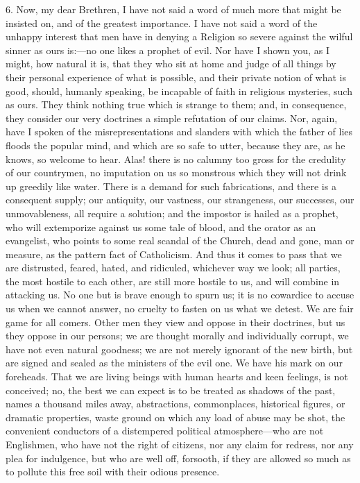 6. Now, my dear Brethren, I have not said a word of
much more that might be insisted on, and of the greatest
importance. I have not said a word of the unhappy
interest that men have in denying a Religion so severe
against the wilful sinner as ours is:—no one likes a
prophet of evil. Nor have I shown you, as I might, how
natural it is, that they who sit at home and judge of all
things by their personal experience of what is possible,
and their private notion of what is good, should, humanly
speaking, be incapable of faith in religious mysteries,
such as ours. They think nothing true which is strange to
them; and, in consequence, they consider our very
doctrines a simple refutation of our claims. Nor, again,
have I spoken of the misrepresentations and slanders with
which the father of lies floods the popular mind, and
which are so safe to utter, because they are, as he
knows, so welcome to hear. Alas! there is no calumny too
gross for the credulity of our countrymen, no imputation
on us so monstrous which they will not drink up greedily
like water. There is a demand for such fabrications, and
there is a consequent supply; our antiquity, our
vastness, our strangeness, our successes, our
unmovableness, all require a solution; and the impostor
is hailed as a prophet, who will extemporize against us
some tale of blood, and the orator as an evangelist, who
points to some real scandal of the Church, dead and gone,
man or measure, as the pattern fact of Catholicism. And
thus it comes to pass that we are distrusted, feared,
hated, and ridiculed, whichever way we look; all parties,
the most hostile to each other, are still more hostile to
us, and will combine in attacking us. No one but is brave
enough to spurn us; it is no cowardice to accuse us when
we cannot answer, no cruelty to fasten on us what we
detest. We are fair game for all comers. Other men they
view and oppose in their doctrines, but us they oppose in
our persons; we are thought morally and individually
corrupt, we have not even natural goodness; we are not
merely ignorant of the new birth, but are signed and
sealed as the ministers of the evil one. We have his mark
on our foreheads. That we are living beings with human
hearts and keen feelings, is not conceived; no, the best
we can expect is to be treated as shadows of the past,
names a thousand miles away, abstractions, commonplaces,
historical figures, or dramatic properties, waste ground
on which any load of abuse may be shot, the convenient
conductors of a distempered political atmosphere—who
are not Englishmen, who have not the right of citizens,
nor any claim for redress, nor any plea for indulgence,
but who are well off, forsooth, if they are allowed so
much as to pollute this free soil with their odious
presence.

